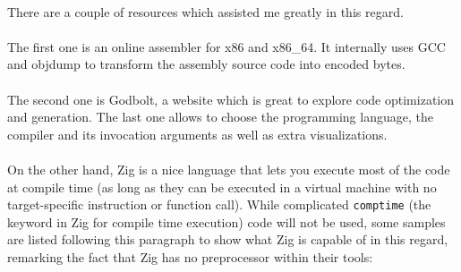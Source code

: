 \documentclass[12pt]{article}
\begin{document}
	\paragraph{}There are a couple of resources which assisted me greatly in this regard.
	\paragraph{}The first one is an online assembler for x86 and x86\_64\cite{online-assembler}. It internally uses \acrshort{GCC} and \gls{objdump} to transform the assembly source code into encoded bytes.
	\paragraph{}The second one is Godbolt, a website which is great to explore code optimization and generation\cite{godbolt}. The last one allows to choose the programming language, the compiler and its invocation arguments as well as extra visualizations.
	\paragraph{}On the other hand, Zig is a nice language that lets you execute most of the code at compile time (as long as they can be executed in a virtual machine with no target-specific instruction or function call). While complicated \verb|comptime| (the keyword in Zig for compile time execution) code will not be used, some samples are listed following this paragraph to show what Zig is capable of in this regard, remarking the fact that Zig has no preprocessor within their tools:
	
\end{document}
